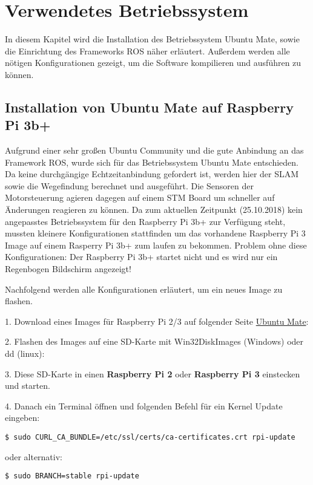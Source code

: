 \chapter{Verwendetes Betriebssystem}
In diesem Kapitel wird die Installation des Betriebssystem Ubuntu Mate, sowie die Einrichtung des Frameworks ROS näher erläutert. Außerdem werden alle nötigen Konfigurationen gezeigt, um die Software kompilieren und ausführen zu können. 


\section{Installation von Ubuntu Mate auf Raspberry Pi 3b+}
Aufgrund einer sehr großen Ubuntu Community und die gute Anbindung an das Framework ROS, wurde sich für das Betriebssystem Ubuntu Mate entschieden. Da keine durchgängige Echtzeitanbindung gefordert ist, werden hier der SLAM sowie die Wegefindung berechnet und ausgeführt. Die Sensoren der Motorsteuerung agieren dagegen auf einem STM Board um schneller auf Änderungen reagieren zu können. 
Da zum aktuellen Zeitpunkt (25.10.2018) kein angepasstes Betriebssystem für den Raspberry Pi 3b+ zur Verfügung steht, mussten kleinere Konfigurationen stattfinden um das vorhandene Raspberry Pi 3 Image auf einem Rasperry Pi 3b+ zum laufen zu bekommen. 
Problem ohne diese Konfigurationen: Der Raspberry Pi 3b+ startet nicht und es wird nur ein Regenbogen Bildschirm angezeigt!

Nachfolgend werden alle Konfigurationen erläutert, um ein neues Image zu flashen. 

1. Download eines Images für Raspberry  Pi 2/3 auf folgender Seite \href{https://ubuntu-mate.org/download/}{Ubuntu Mate}:

2. Flashen des Images auf eine SD-Karte mit Win32DiskImages (Windows) oder dd (linux):

3. Diese SD-Karte in einen \textbf{Raspberry Pi 2} oder \textbf{Raspberry Pi 3} einstecken und starten. 

4. Danach ein Terminal öffnen und folgenden Befehl für ein Kernel Update eingeben:\\

\begin{lstlisting}
$ sudo CURL_CA_BUNDLE=/etc/ssl/certs/ca-certificates.crt rpi-update
\end{lstlisting}

oder alternativ:\\

\begin{lstlisting}
$ sudo BRANCH=stable rpi-update
\end{lstlisting}

